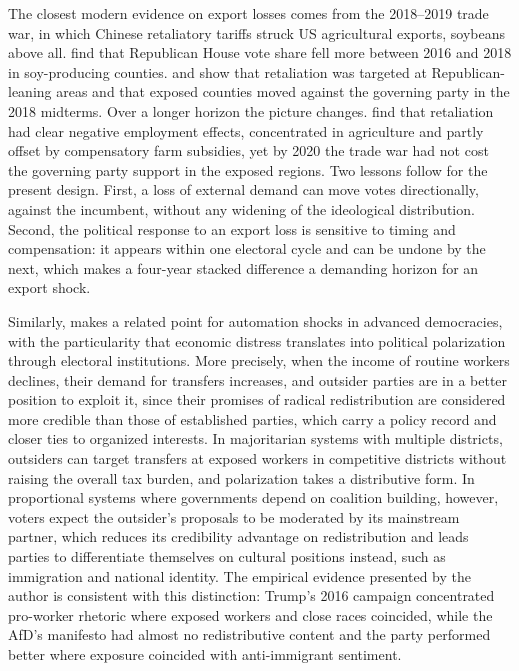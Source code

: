 \documentclass[
	11pt,				%
	oneside,			%
	a4paper,			%
	english,			%
	english				%
	]{abntex2ppgsi}
\theoremstyle{plain}
\theoremstyle{remark}
\theoremstyle{plain}%
\theoremstyle{remark}%
\begin{document}
The closest modern evidence on export losses comes from the 2018--2019 trade war, in which Chinese retaliatory tariffs struck US agricultural exports, soybeans above all.  find that Republican House vote share fell more between 2016 and 2018 in soy-producing counties.  and  show that retaliation was targeted at Republican-leaning areas and that exposed counties moved against the governing party in the 2018 midterms. Over a longer horizon the picture changes.  find that retaliation had clear negative employment effects, concentrated in agriculture and partly offset by compensatory farm subsidies, yet by 2020 the trade war had not cost the governing party support in the exposed regions. Two lessons follow for the present design. First, a loss of external demand can move votes directionally, against the incumbent, without any widening of the ideological distribution. Second, the political response to an export loss is sensitive to timing and compensation: it appears within one electoral cycle and can be undone by the next, which makes a four-year stacked difference a demanding horizon for an export shock.

Similarly,  makes a related point for automation shocks in advanced democracies, with the particularity that economic distress translates into political polarization through electoral institutions. More precisely, when the income of routine workers declines, their demand for transfers increases, and outsider parties are in a better position to exploit it, since their promises of radical redistribution are considered more credible than those of established parties, which carry a policy record and closer ties to organized interests. In majoritarian systems with multiple districts, outsiders can target transfers at exposed workers in competitive districts without raising the overall tax burden, and polarization takes a distributive form. In proportional systems where governments depend on coalition building, however, voters expect the outsider's proposals to be moderated by its mainstream partner, which reduces its credibility advantage on redistribution and leads parties to differentiate themselves on cultural positions instead, such as immigration and national identity. The empirical evidence presented by the author is consistent with this distinction: Trump's 2016 campaign concentrated pro-worker rhetoric where exposed workers and close races coincided, while the AfD's manifesto had almost no redistributive content and the party performed better where exposure coincided with anti-immigrant sentiment.
\end{document}

